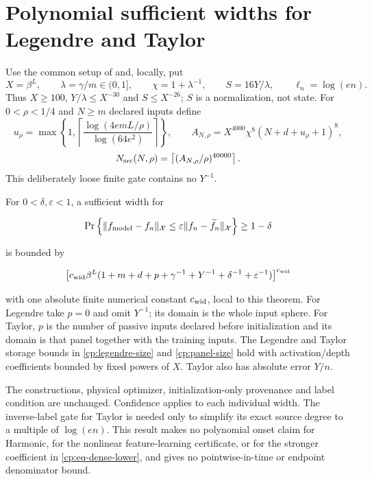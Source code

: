 \section{Polynomial sufficient widths for Legendre and Taylor}
\label{cp:poly:width-section}

Use the common setup of  and, locally, put
\[
X=\beta^L,\qquad \lambda=\gamma/m\in(0,1],\qquad
\chi=1+\lambda^{-1},\qquad S=16Y/\lambda,\qquad \ell_n=\log(en).
\]
Thus $X\ge100$, $Y/\lambda\le X^{-30}$ and $S\le X^{-26}$;
$S$ is a normalization, not state. For $0<\rho<1/4$ and $N\ge m$
declared inputs define
\[
u_\rho=\max\left\{1,\left\lceil
 \frac{\log(4emL/\rho)}{\log(64e^2)}\right\rceil\right\},\qquad
A_{N,\rho}=X^{4000}\chi^8(N+d+u_\rho+1)^8,
\]
\begin{equation}
N_{\rm src}(N,\rho)
=\left\lceil(A_{N,\rho}/\rho)^{40000}\right\rceil.
\label{cp:poly:eq:source-width}
\end{equation}
This deliberately loose finite gate contains no $Y^{-1}$.

\begin{theorem}
\label{cp:poly:width}

For $0<\delta,\varepsilon<1$, a sufficient width for

\[
\Pr\left\{
 \|f_{\rm model}-f_n\|_{\mathcal X}
 \le\varepsilon\|f_n-\widetilde f_n\|_{\mathcal X}
 \right\}\ge1-\delta
\]

is bounded by

\[
\left[c_{\rm wid}\beta^L
 (1+m+d+p+\gamma^{-1}+Y^{-1}+\delta^{-1}+\varepsilon^{-1})
 \right]^{c_{\rm wid}}
\]

with one absolute finite numerical constant $c_{\rm wid}$, local to this theorem. For Legendre take $p=0$ and omit
$Y^{-1}$; its domain is the whole input sphere. For Taylor, $p$ is the
number of passive inputs declared before initialization and its domain is
that panel together with the training inputs. The Legendre and Taylor
storage bounds in \eqref{cp:legendre-size} and
\eqref{cp:panel-size} hold with activation/depth coefficients bounded
by fixed powers of $X$. Taylor also has absolute error $Y/n$.

The constructions, physical optimizer, initialization-only provenance and
label condition are unchanged. Confidence applies to each individual width.
The inverse-label gate for Taylor is needed only to simplify its exact
source degree to a multiple of $\log(en)$. This result makes no polynomial
onset claim for Harmonic, for the nonlinear feature-learning certificate,
or for the stronger coefficient in \eqref{cp:eq-dense-lower}, and gives no
pointwise-in-time or endpoint denominator bound.

\end{theorem}

